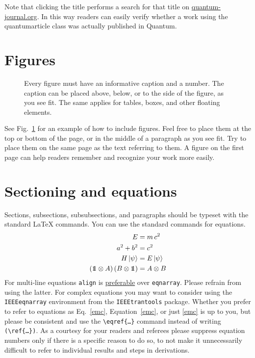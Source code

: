 \documentclass[a4paper,twocolumn,superscriptaddress,11pt,accepted=2017-05-09]{quantumarticle}
\begin{document}
Note that clicking the title performs a search for that title on \href{http://quantum-journal.org}{quantum-journal.org}.
In this way readers can easily verify whether a work using the quantumarticle class was actually published in Quantum.

\section{Figures}
\begin{figure}[t]
  \centering
  \caption{Every figure must have an informative caption and a number.
    The caption can be placed above, below, or to the side of the figure, as you see fit.
    The same applies for tables, boxes, and other floating elements.}
  \label{fig:figure1}
\end{figure}
See Fig.~\ref{fig:figure1} for an example of how to include figures.
Feel free to place them at the top or bottom of the page, or in the middle of a paragraph as you see fit.
Try to place them on the same page as the text referring to them.
A figure on the first page can help readers remember and recognize your work more easily.

\section{Sectioning and equations}
Sections, subsections, subsubsections, and paragraphs should be typeset with the standard LaTeX commands.
You can use the standard commands for equations.
\begin{align}
  \label{emc}
  E &= m\,c^2\\
  a^2 + b^2 &= c^2\\
  H\,|\psi\rangle &= E\,|\psi\rangle\\
  ({\mbox{\small1}\mkern-5.5mu1} \otimes A)\,(B \otimes {\mbox{\small1}\mkern-5.5mu1}) &= A \otimes B
\end{align}
For multi-line equations \texttt{align} is \href{http://tex.stackexchange.com/questions/196/eqnarray-vs-align}{preferable} over \texttt{eqnarray}.
Please refrain from using the latter.
For complex equations you may want to consider using the \texttt{IEEEeqnarray} environment from the \texttt{IEEEtrantools} package.
Whether you prefer to refer to equations as Eq.~\eqref{emc}, Equation~\ref{emc}, or just \eqref{emc} is up to you, but please be consistent and use the \texttt{\textbackslash{}eqref\{\dots\}} command instead of writing \texttt{(\textbackslash{}ref\{\dots\})}.
As a courtesy for your readers and referees please suppress equation numbers only if there is a specific reason to do so, to not make it unnecessarily difficult to refer to individual results and steps in derivations.
\end{document}
